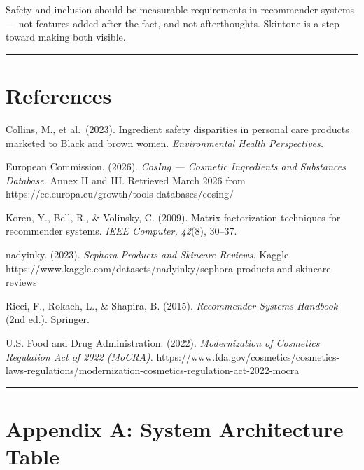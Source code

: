\documentclass[
  letterpaper,
  DIV=11,
  numbers=noendperiod]{scrartcl}
\begin{document}
Safety and inclusion should be measurable requirements in recommender
systems --- not features added after the fact, and not afterthoughts.
Skintone is a step toward making both visible.

\begin{center}\rule{0.5\linewidth}{0.5pt}\end{center}

\section{References}\label{references}

Collins, M., et al.~(2023). Ingredient safety disparities in personal
care products marketed to Black and brown women. \emph{Environmental
Health Perspectives.}

European Commission. (2026). \emph{CosIng --- Cosmetic Ingredients and
Substances Database.} Annex II and III. Retrieved March 2026 from
https://ec.europa.eu/growth/tools-databases/cosing/

Koren, Y., Bell, R., \& Volinsky, C. (2009). Matrix factorization
techniques for recommender systems. \emph{IEEE Computer, 42}(8), 30--37.

nadyinky. (2023). \emph{Sephora Products and Skincare Reviews.} Kaggle.
https://www.kaggle.com/datasets/nadyinky/sephora-products-and-skincare-reviews

Ricci, F., Rokach, L., \& Shapira, B. (2015). \emph{Recommender Systems
Handbook} (2nd ed.). Springer.

U.S. Food and Drug Administration. (2022). \emph{Modernization of
Cosmetics Regulation Act of 2022 (MoCRA).}
https://www.fda.gov/cosmetics/cosmetics-laws-regulations/modernization-cosmetics-regulation-act-2022-mocra

\begin{center}\rule{0.5\linewidth}{0.5pt}\end{center}

\section{Appendix A: System Architecture
Table}\label{appendix-a-system-architecture-table}
\end{document}
